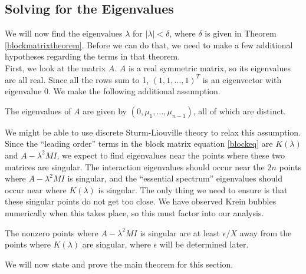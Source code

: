 \documentclass[thesis.tex]{subfiles}
\begin{document}
\subsection{Solving for the Eigenvalues}

We will now find the eigenvalues $\lambda$ for $|\lambda| < \delta$, where $\delta$ is given in Theorem \ref{blockmatrixtheorem}. Before we can do that, we need to make a few additional hypotheses regarding the terms in that theorem.\\

First, we look at the matrix $A$. $A$ is a real symmetric matrix, so its eigenvalues are all real. Since all the rows sum to 1, $(1, 1, \dots, 1)^T$ is an eigenvector with eigenvalue 0. We make the following additional assumption.\\

\begin{hypothesis}\label{Adistincteigs}
The eigenvalues of $A$ are given by $(0, \mu_1, \dots, \mu_{n-1})$, all of which are distinct.
\end{hypothesis}

We might be able to use discrete Sturm-Liouville theory to relax this assumption.\\

Since the ``leading order'' terms in the block matrix equation \ref{blockeq} are $K(\lambda)$ and $A - \lambda^2 M I$, we expect to find eigenvalues near the points where these two matrices are singular. The interaction eigenvalues should occur near the $2n$ points where $A - \lambda^2 M I$ is singular, and the ``essential spectrum'' eigenvalues should occur near where $K(\lambda)$ is singular. The only thing we need to ensure is that these singular points do not get too close. We have observed Krein bubbles numerically when this takes place, so this must factor into our analysis.

\begin{hypothesis}\label{epsilonballs}
The nonzero points where $A - \lambda^2 MI$ is singular are at least $\epsilon/X$ away from the points where $K(\lambda)$ are singular, where $\epsilon$ will be determined later.
\end{hypothesis}

We will now state and prove the main theorem for this section.
\end{document}
